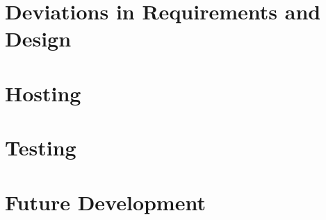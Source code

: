 \chapter{Deviations in Requirements and Design}


\chapter{Hosting}


\chapter{Testing}


\chapter{Future Development}

